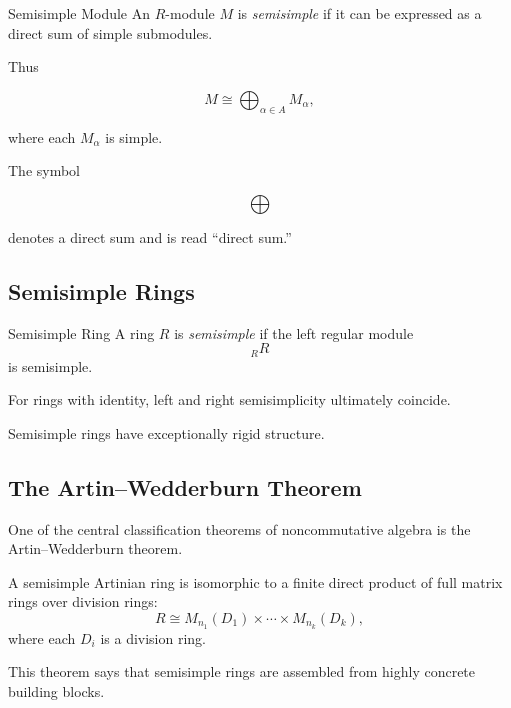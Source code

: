 \begin{definitionbox}{Semisimple Module}
An \(R\)-module \(M\) is \emph{semisimple} if it can be expressed as a direct
sum of simple submodules.
\end{definitionbox}

Thus

\[ M\cong\bigoplus_{\alpha\in A}M_\alpha, \]

where each \(M_\alpha\) is simple.

The symbol

\[ \bigoplus \]

denotes a direct sum and is read ``direct sum.''

\subsection{Semisimple Rings}
\label{subsec:semisimple-rings}

\begin{definitionbox}{Semisimple Ring}
A ring \(R\) is \emph{semisimple} if the left regular module
\[ {}_RR \]
is semisimple.
\end{definitionbox}

For rings with identity, left and right semisimplicity ultimately coincide.

Semisimple rings have exceptionally rigid structure.

\subsection{The Artin--Wedderburn Theorem}
\label{subsec:artin-wedderburn}

One of the central classification theorems of noncommutative algebra is the
Artin--Wedderburn theorem.

\begin{theorem}
A semisimple Artinian ring is isomorphic to a finite direct product of full
matrix rings over division rings:
\[ R\cong M_{n_1}(D_1)\times\cdots\times M_{n_k}(D_k), \]
where each \(D_i\) is a division ring.
\end{theorem}

This theorem says that semisimple rings are assembled from highly concrete
building blocks.

